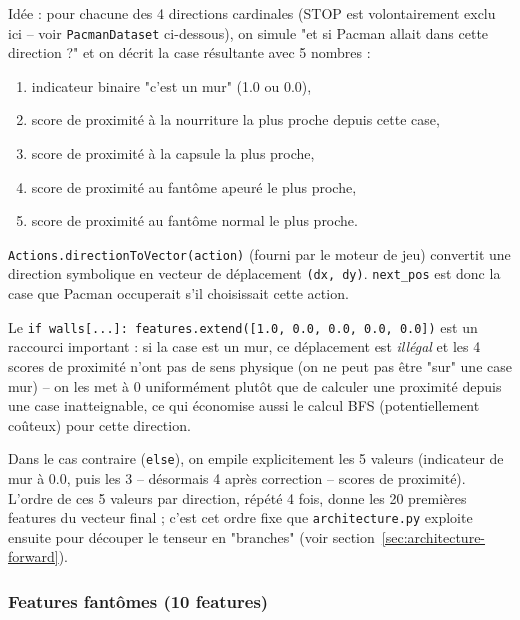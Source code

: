 \documentclass[a4paper,12pt]{article}
\begin{document}
Idée : pour chacune des 4 directions cardinales (STOP est volontairement
exclu ici -- voir \texttt{PacmanDataset} ci-dessous), on simule "et si
Pacman allait dans cette direction ?" et on décrit la case résultante
avec 5 nombres :
\begin{enumerate}
    \item indicateur binaire "c'est un mur" (1.0 ou 0.0),
    \item score de proximité à la nourriture la plus proche depuis cette
    case,
    \item score de proximité à la capsule la plus proche,
    \item score de proximité au fantôme apeuré le plus proche,
    \item score de proximité au fantôme normal le plus proche.
\end{enumerate}

\texttt{Actions.directionToVector(action)} (fourni par le moteur de jeu)
convertit une direction symbolique en vecteur de déplacement
\texttt{(dx, dy)}. \texttt{next\_pos} est donc la case que Pacman
occuperait s'il choisissait cette action.

Le \texttt{if walls[...]: features.extend([1.0, 0.0, 0.0, 0.0, 0.0])} est
un raccourci important : si la case est un mur, ce déplacement est
\emph{illégal} et les 4 scores de proximité n'ont pas de sens physique
(on ne peut pas être "sur" une case mur) -- on les met à 0 uniformément
plutôt que de calculer une proximité depuis une case inatteignable, ce
qui économise aussi le calcul BFS (potentiellement coûteux) pour cette
direction.

Dans le cas contraire (\texttt{else}), on empile explicitement les 5
valeurs (indicateur de mur à 0.0, puis les 3 -- désormais 4 après
correction -- scores de proximité). L'ordre de ces 5 valeurs par
direction, répété 4 fois, donne les 20 premières features du vecteur
final ; c'est cet ordre fixe que \texttt{architecture.py} exploite ensuite
pour découper le tenseur en "branches" (voir
section~\ref{sec:architecture-forward}).

\subsubsection{Features fantômes (10 features)}
\end{document}
